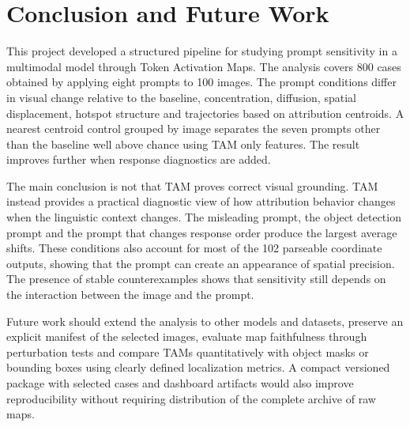 \documentclass[11pt,a4paper]{article}
\begin{document}
\section{Conclusion and Future Work}

This project developed a structured pipeline for studying prompt sensitivity in a multimodal model through Token Activation Maps. The analysis covers 800 cases obtained by applying eight prompts to 100 images. The prompt conditions differ in visual change relative to the baseline, concentration, diffusion, spatial displacement, hotspot structure and trajectories based on attribution centroids. A nearest centroid control grouped by image separates the seven prompts other than the baseline well above chance using TAM only features. The result improves further when response diagnostics are added.

The main conclusion is not that TAM proves correct visual grounding. TAM instead provides a practical diagnostic view of how attribution behavior changes when the linguistic context changes. The misleading prompt, the object detection prompt and the prompt that changes response order produce the largest average shifts. These conditions also account for most of the 102 parseable coordinate outputs, showing that the prompt can create an appearance of spatial precision. The presence of stable counterexamples shows that sensitivity still depends on the interaction between the image and the prompt.

Future work should extend the analysis to other models and datasets, preserve an explicit manifest of the selected images, evaluate map faithfulness through perturbation tests and compare TAMs quantitatively with object masks or bounding boxes using clearly defined localization metrics. A compact versioned package with selected cases and dashboard artifacts would also improve reproducibility without requiring distribution of the complete archive of raw maps.

\printbibliography[heading=bibintoc,title={References}]
\end{document}

